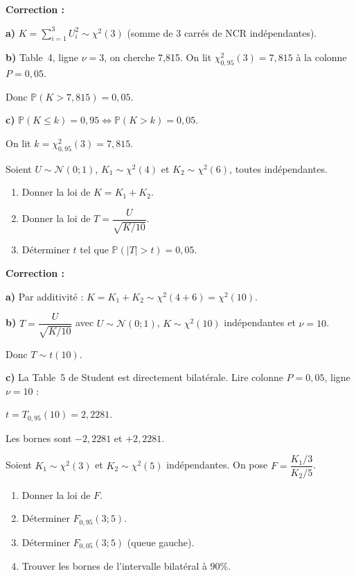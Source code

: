 \documentclass[11pt,a4paper]{article}
\newcommand{\N}{\mathcal{N}}
\newcommand{\Prob}{\mathbb{P}}
\renewcommand{\P}{\Prob}
\begin{document}
\textbf{Correction :}

\textbf{a)} $K = \sum_{i=1}^{3} U_i^2 \sim \chi^2(3)$ (somme de 3 carr\'es de NCR ind\'ependantes).

\medskip
\textbf{b)} Table~4, ligne $\nu=3$, on cherche 7,815. On lit $\chi^2_{0{,}95}(3) = 7{,}815$ \`a la colonne $P=0{,}05$.

Donc $\P(K > 7{,}815) = 0{,}05$.

\medskip
\textbf{c)} $\P(K \leq k) = 0{,}95 \Leftrightarrow \P(K > k) = 0{,}05$.

On lit $k = \chi^2_{0{,}95}(3) = 7{,}815$.

\bigskip
\begin{thmbox}
Soient $U \sim \N(0;1)$, $K_1 \sim \chi^2(4)$ et $K_2 \sim \chi^2(6)$, toutes ind\'ependantes.
\begin{enumerate}[label=\alph*)]
\item Donner la loi de $K = K_1 + K_2$.
\item Donner la loi de $T = \dfrac{U}{\sqrt{K/10}}$.
\item D\'eterminer $t$ tel que $\P(|T| > t) = 0{,}05$.
\end{enumerate}
\end{thmbox}

\textbf{Correction :}

\textbf{a)} Par additivit\'e : $K = K_1 + K_2 \sim \chi^2(4+6) = \chi^2(10)$.

\medskip
\textbf{b)} $T = \dfrac{U}{\sqrt{K/10}}$ avec $U \sim \N(0;1)$, $K \sim \chi^2(10)$ ind\'ependantes et $\nu = 10$.

Donc $T \sim t(10)$.

\medskip
\textbf{c)} La Table~5 de Student est directement bilat\'erale. Lire colonne $P=0{,}05$, ligne $\nu=10$ :

$t = T_{0{,}95}(10) = 2{,}2281.$

Les bornes sont $-2{,}2281$ et $+2{,}2281$.

\bigskip
\begin{thmbox}
Soient $K_1 \sim \chi^2(3)$ et $K_2 \sim \chi^2(5)$ ind\'ependantes. On pose $F = \dfrac{K_1/3}{K_2/5}$.
\begin{enumerate}[label=\alph*)]
\item Donner la loi de $F$.
\item D\'eterminer $F_{0{,}95}(3;5)$.
\item D\'eterminer $F_{0{,}05}(3;5)$ (queue gauche).
\item Trouver les bornes de l'intervalle bilat\'eral \`a $90\%$.
\end{enumerate}
\end{thmbox}
\end{document}
